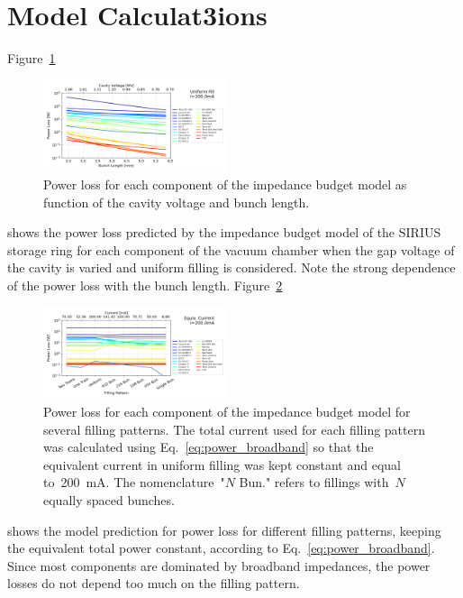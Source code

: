 \documentclass
[
    a4paper,
]{jacow}
\begin{document}
\section{Model Calculat3ions}

    Figure~\ref{fig:model_vary_vgap}
    \begin{figure}
        \centering
        \includegraphics[width=0.48\textwidth]{THPC44_f4.png}
        \caption{Power loss for each component of the impedance budget model as function of the cavity voltage and bunch length.}
        \label{fig:model_vary_vgap}
    \end{figure}
     shows the power loss predicted by the impedance budget model of the SIRIUS storage ring for each component of the vacuum chamber when the gap voltage of the cavity is varied and uniform filling is considered. Note the strong dependence of the power loss with the bunch length. Figure~\ref{fig:model_vary_fillp}
    \begin{figure}
        \centering
        \includegraphics[width=0.48\textwidth]{THPC44_f5.png}
        \caption{Power loss for each component of the impedance budget model for several filling patterns. The total current used for each filling pattern was calculated using Eq.~\eqref{eq:power_broadband} so that the equivalent current in uniform filling was kept constant and equal to~\SI{200}{\milli\ampere}. The nomenclature~"$\!N$ Bun." refers to fillings with~$N$ equally spaced bunches.}
        \label{fig:model_vary_fillp}
    \end{figure}
     shows the model prediction for power loss for different filling patterns, keeping the equivalent total power constant, according to Eq.~\eqref{eq:power_broadband}. Since most components are dominated by broadband impedances, the power losses do not depend too much on the filling pattern.
    
\end{document}
